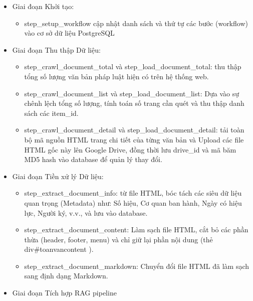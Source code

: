 \begin{itemize}


\item Giai đoạn Khởi tạo:
\begin{itemize}

\item step\_setup\_workflow cập nhật danh sách và thứ tự các bước (workflow) vào cơ sở dữ liệu PostgreSQL


\end{itemize}
\item Giai đoạn Thu thập Dữ liệu:
\begin{itemize}

\item step\_crawl\_document\_total và step\_load\_document\_total: thu thập tổng số lượng văn bản pháp luật hiện có trên hệ thống web.
\item step\_crawl\_document\_list và step\_load\_document\_list: Dựa vào sự chênh lệch tổng số lượng, tính toán số trang cần quét và thu thập danh sách các item\_id.
\item step\_crawl\_document\_detail và step\_load\_document\_detail: tải toàn bộ mã nguồn HTML trang chi tiết của từng văn bản và Upload các file HTML gốc này lên Google Drive, đồng thời lưu drive\_id và mã băm MD5 hash vào database để quản lý thay đổi.


\end{itemize}
\item Giai đoạn Tiền xử lý Dữ liệu:
\begin{itemize}

\item step\_extract\_document\_info: từ file HTML, bóc tách các siêu dữ liệu quan trọng (Metadata) như: Số hiệu, Cơ quan ban hành, Ngày có hiệu lực, Người ký, v.v., và lưu vào database.
\item step\_extract\_document\_content: Làm sạch file HTML, cắt bỏ các phần thừa (header, footer, menu) và chỉ giữ lại phần nội dung (thẻ div\#toanvancontent ).
\item step\_extract\_document\_markdown: Chuyển đổi file HTML đã làm sạch sang định dạng Markdown.


\end{itemize}
\item Giai đoạn Tích hợp RAG pipeline
\begin{itemize}


\end{itemize}
\end{itemize}
